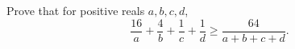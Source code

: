 Prove that for positive reals $a,b,c,d$,
\[
\dfrac{16}{a}+\dfrac{4}{b}+\dfrac{1}{c}+\dfrac{1}{d}\ge\dfrac{64}{a+b+c+d}.
\]
